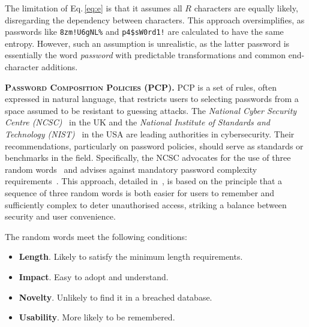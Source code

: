 The limitation of Eq.\,\ref{eq:e} is that it assumes all $R$ characters are equally likely, disregarding the dependency between characters. This approach oversimplifies, as passwords like \texttt{8zm!U6gNL\%} and \texttt{p4\$sW0rd1!} are calculated to have the same entropy. However, such an assumption is unrealistic, as the latter password is essentially the word \textit{password} with predictable transformations and common end-character additions.

\textbf{\textsc{Password Composition Policies (PCP).}}\: PCP is a set of rules, often expressed in natural language, that restricts users to selecting passwords from a space assumed to be resistant to guessing attacks. The \textit{National Cyber Security Centre (NCSC)}~\cite{ncsc2024} in the UK and the \textit{National Institute of Standards and Technology (NIST)}~\cite{nist2024} in the USA are leading authorities in cybersecurity. Their recommendations, particularly on password policies, should serve as standards or benchmarks in the field. Specifically, the NCSC advocates for the use of three random words~\cite{McCormackthreerandom} and advises against mandatory password complexity requirements~\cite{password_policy_ncsc}. This approach, detailed in~\cite{Kate_2021}, is based on the principle that a sequence of three random words is both easier for users to remember and sufficiently complex to deter unauthorised access, striking a balance between security and user convenience.

The random words meet the following conditions:

\begin{itemize}[itemsep=0pt, parsep=0pt, leftmargin=11pt]
    \item \textbf{Length}.  Likely to satisfy the minimum length requirements.
    \item \textbf{Impact}.  Easy to adopt and understand.
    \item \textbf{Novelty}.  Unlikely to find it in a breached database.
    \item \textbf{Usability}.  More likely to be remembered.
\end{itemize}


